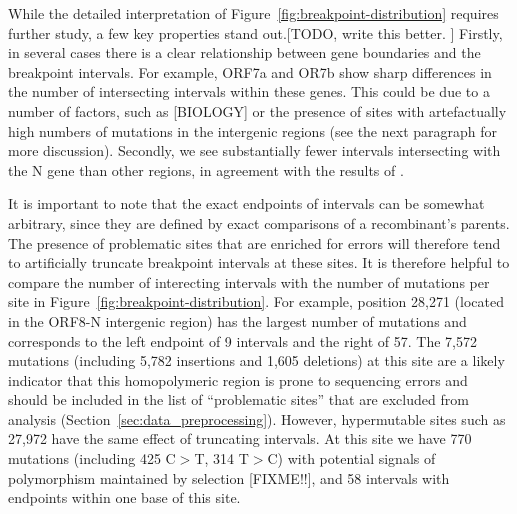 \documentclass{article}
\begin{document}
While the detailed interpretation of Figure~\ref{fig:breakpoint-distribution}
requires further study, a few key properties stand out.[TODO, write this
better. ] Firstly, in several cases there is a clear relationship between
gene boundaries and the breakpoint intervals. For example, ORF7a and OR7b
show sharp differences in the number of intersecting intervals within
these genes. This could be due to a number of factors, such as [BIOLOGY]
or the presence of sites with artefactually high numbers of mutations
in the intergenic regions (see the next paragraph for more discussion).
Secondly, we see substantially fewer intervals intersecting with the N
gene than other regions, in agreement with the results of
\cite{Turakhia2022-it}.

It is important to note that the exact endpoints of intervals can be
somewhat arbitrary, since they are defined by exact comparisons
of a recombinant's parents. The presence of problematic sites that are enriched
for errors will therefore tend to artificially truncate breakpoint intervals
at these sites.
It is therefore helpful to compare the number of interecting intervals
with the number of mutations per site in Figure~\ref{fig:breakpoint-distribution}.
For example, position 28,271 (located in the ORF8-N intergenic
region) has the largest number of mutations and corresponds to the
left endpoint of 9 intervals and the right of 57.
The 7,572 mutations  (including 5,782 insertions and 1,605 deletions)
at this site are a likely indicator that this
homopolymeric region is prone to sequencing errors
and should be included in the list of ``problematic sites'' that
are excluded from analysis (Section~\ref{sec:data_preprocessing}).
However, hypermutable sites such as 27,972 \citep{Jungreis2021-dh}
have the same effect of truncating intervals. At this site we have
770 mutations (including 425 C$>$T, 314 T$>$C) with potential signals
of polymorphism maintained by selection [FIXME!!], and 58 intervals
with endpoints within one base of this site.

\end{document}
